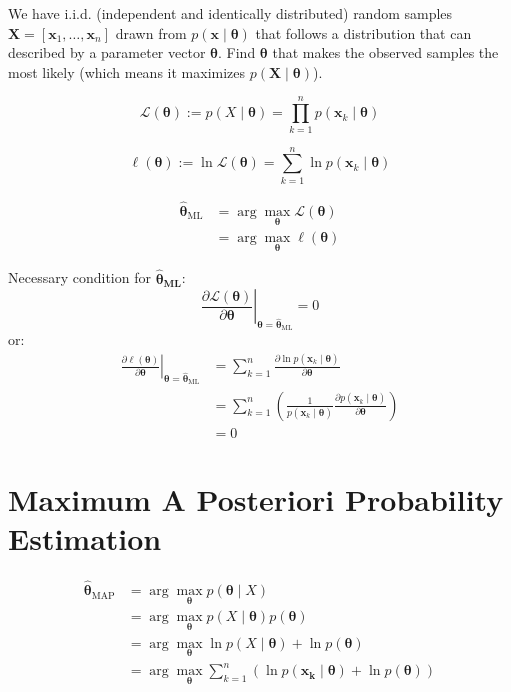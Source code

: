 \documentclass{report}
\begin{document}
We have i.i.d. (independent and identically distributed) random samples $\symbf{X} = [\symbf{x}_1, \ldots, \symbf{x}_n]$ drawn from $p(\symbf{x} \mid \symbf{\theta})$ that follows a distribution that can described by a parameter vector $\symbf{\theta}$.
Find $\symbf{\theta}$ that makes the observed samples the most likely (which means it maximizes $p(\symbf{X} \mid \symbf{\theta})$).

\[\mathcal{L}(\symbf{\theta}) := p(X \mid \symbf{\theta}) = \prod_{k=1}^{n} p(\symbf{x}_k \mid \symbf{\theta})\]

\[\ell(\symbf{\theta}) := \ln \mathcal{L}(\symbf{\theta}) = \sum_{k=1}^n \ln p(\symbf{x}_k \mid \symbf{\theta})\]

\[\begin{split}
	\symbf{\hat \theta}_{\text{ML}} &= \arg\max_{\symbf{\theta}} \mathcal{L}(\symbf{\theta}) \\
	&= \arg\max_{\symbf{\theta}} \ell(\symbf{\theta})
\end{split}\]

Necessary condition for $\symbf{\hat \theta_{\text{ML}}}$:
\[\left. \frac{\partial \mathcal{L}(\symbf{\theta})}{\partial \symbf{\theta}} \right|_{\symbf{\theta} = \symbf{\hat \theta}_{\text{ML}}} = 0\]
or:
\[\begin{split}
	\left. \frac{\partial \ell(\symbf{\theta})}{\partial \symbf{\theta}} \right|_{\symbf{\theta} = \symbf{\hat \theta}_{\text{ML}}} &= \sum_{k=1}^n \frac{\partial \ln p(\symbf{x}_k \mid \symbf{\theta})}{\partial \symbf{\theta}} \\
	&= \sum_{k=1}^n \left( \frac{1}{p(\symbf{x}_k \mid \symbf{\theta})} \frac{\partial p(\symbf{x}_k \mid \symbf{\theta})}{\partial \symbf{\theta}} \right) \\
	&= 0
\end{split}\]

\section{Maximum A Posteriori Probability Estimation}

\[\begin{split}
	\symbf{\hat \theta}_{\text{MAP}} &= \arg\max_{\symbf{\theta}} p(\symbf{\theta} \mid X) \\
	&= \arg\max_{\symbf{\theta}} p(X \mid \symbf{\theta}) p(\symbf{\theta}) \\
	&= \arg\max_{\symbf{\theta}} \ln p(X \mid \symbf{\theta}) + \ln p(\symbf{\theta}) \\
	&= \arg\max_{\symbf{\theta}} \sum_{k=1}^n \left( \ln p(\symbf{x_k} \mid \symbf{\theta}) + \ln p(\symbf{\theta}) \right)
\end{split}\]
\end{document}
